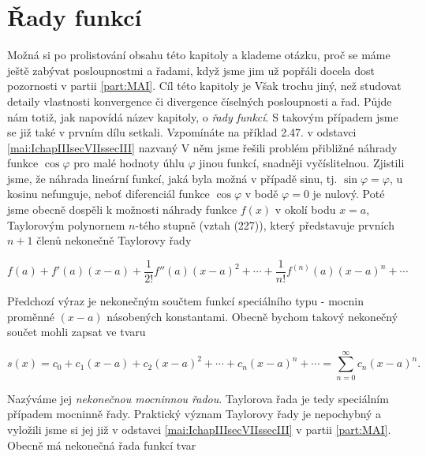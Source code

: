 \setchaptertoc
\chapter{Řady funkcí}\label{mai:IIchapV}
  Možná si po prolistování obsahu této kapitoly a klademe otázku, proč se máme ještě zabývat
  posloupnostmi a řadami, když jsme jim už popřáli docela dost pozornosti v partii \ref{part:MAI}.
  Cíl této kapitoly je Však trochu jiný, než studovat detaily vlastnosti konvergence či divergence
  číselných posloupnosti a řad. Půjde nám totiž, jak napovídá název kapitoly, o \emph{řady funkcí}.
  S takovým případem jsme se již také v prvním dílu setkali. Vzpomínáte na příklad 2.47. v odstavci
  \ref{mai:IchapIIIsecVIIssecIII} nazvaný  V něm jsme řešili problém
  přibližné náhrady funkce \(\cos\varphi\) pro malé hodnoty úhlu \(\varphi\) jinou funkcí, snadněji
  vyčíslitelnou. Zjistili jsme, že náhrada lineární funkcí, jaká byla možná v případě sinu, tj.
  \(\sin\varphi = \varphi\), u kosinu nefunguje, neboť diferenciál funkce \(\cos\varphi\) v bodě
  \(\varphi = 0\) je nulový. Poté jsme obecně dospěli k možnosti náhrady funkce \(f(x)\) v okolí
  bodu \(x=a\), Taylorovým polynornem \(n\)-tého stupně (vztah (227)), který představuje prvních \(n
  +1\) členů nekonečně Taylorovy řady
  \begin{strip}
    \begin{equation*}
      f(a)+f'(a)(x-a)+\frac{1}{2!}f''(a)(x-a)^2+\cdots+\frac{1}{n!}f^{(n)}(a)(x-a)^n+\cdots
    \end{equation*}
  \end{strip}
  Předchozí výraz je nekonečným součtem funkcí speciálního typu - mocnin proměnné \((x-a)\)
  násobených konstantami. Obecně bychom takový nekonečný součet mohli zapsat ve tvaru
  \begin{strip}
    \begin{equation*}
      s(x) = c_0 + c_1(x-a)+c_2(x-a)^2 + \cdots + c_n(x-a)^n + \cdots = \sum_{n=0}^\infty c_n(x-a)^n.
    \end{equation*}
  \end{strip}
  Nazýváme jej \emph{nekonečnou mocninnou řadou}. Taylorova řada je tedy speciálním případem
  mocninně řady. Praktický význam Taylorovy řady je nepochybný a vyložili jsme si jej již v odstavci
  \ref{mai:IchapIIIsecVIIssecIII} v partii \ref{part:MAI}. Obecně má nekonečná řada funkcí tvar

